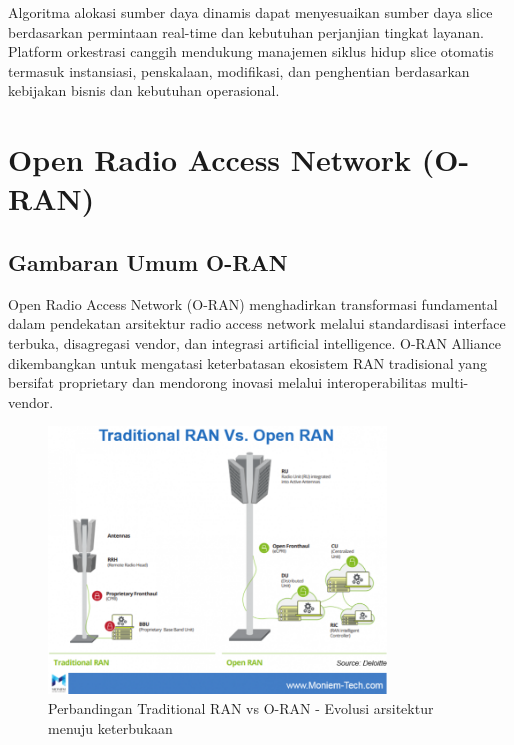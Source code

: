 Algoritma alokasi sumber daya dinamis dapat menyesuaikan sumber daya slice berdasarkan permintaan real-time dan kebutuhan perjanjian tingkat layanan. Platform orkestrasi canggih mendukung manajemen siklus hidup slice otomatis termasuk instansiasi, penskalaan, modifikasi, dan penghentian berdasarkan kebijakan bisnis dan kebutuhan operasional.

\section{Open Radio Access Network (O-RAN)}

\subsection{Gambaran Umum O-RAN}

Open Radio Access Network (O-RAN) menghadirkan transformasi fundamental dalam pendekatan arsitektur radio access network melalui standardisasi interface terbuka, disagregasi vendor, dan integrasi artificial intelligence. O-RAN Alliance dikembangkan untuk mengatasi keterbatasan ekosistem RAN tradisional yang bersifat proprietary dan mendorong inovasi melalui interoperabilitas multi-vendor.

\begin{figure}[htbp]
    \centering
    \includegraphics[width=0.8\textwidth]{assets/pics/bab3_10.png}
    \caption{Perbandingan Traditional RAN vs O-RAN - Evolusi arsitektur menuju keterbukaan}
    \label{fig:traditional_vs_oran}
\end{figure}

